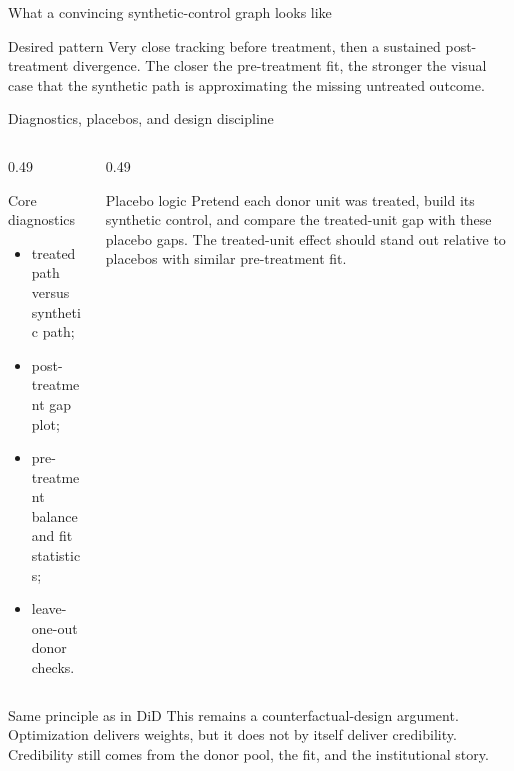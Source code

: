 \documentclass[10pt]{beamer}
\begin{document}
\begin{frame}{What a convincing synthetic-control graph looks like}
\label{slide:sc_plot}
\centering
{}

\vspace{0.5em}
\begin{block}{Desired pattern}
Very close tracking before treatment, then a sustained post-treatment divergence. The closer the pre-treatment fit, the stronger the visual case that the synthetic path is approximating the missing untreated outcome.
\end{block}
\end{frame}

\begin{frame}{Diagnostics, placebos, and design discipline}
\label{slide:sc_placebo}
\small
\begin{columns}[T]
\begin{column}{0.49\textwidth}
\begin{block}{Core diagnostics}
\begin{itemize}
  \item treated path versus synthetic path;
  \item post-treatment gap plot;
  \item pre-treatment balance and fit statistics;
  \item leave-one-out donor checks.
\end{itemize}
\end{block}
\end{column}
\begin{column}{0.49\textwidth}
\begin{block}{Placebo logic}
Pretend each donor unit was treated, build its synthetic control, and compare the treated-unit gap with these placebo gaps. The treated-unit effect should stand out relative to placebos with similar pre-treatment fit.
\end{block}
\end{column}
\end{columns}

\begin{alertblock}{Same principle as in DiD}
This remains a counterfactual-design argument. Optimization delivers weights, but it does not by itself deliver credibility. Credibility still comes from the donor pool, the fit, and the institutional story.
\end{alertblock}
\end{frame}
\end{document}
